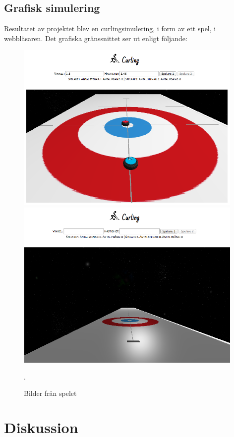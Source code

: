 \documentclass[11pt]{article} %
\begin{document}
\pagebreak

\subsection{Grafisk simulering}
Resultatet av projektet blev en curlingsimulering, i form av ett spel, i webbläsaren. Det grafiska gränssnittet ser ut enligt följande: 

\begin{figure}[ht!]
\centering
\includegraphics[width=110mm]{game4.png}
\includegraphics[width=110mm]{game2.png}
\caption{Bilder från spelet}.
\label{fig:spell}
\label{overflow}
\end{figure}


\section{Diskussion}
\end{document}
